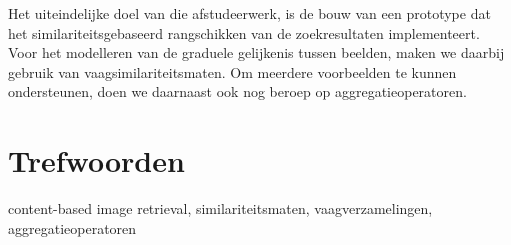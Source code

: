 Het uiteindelijke doel van die afstudeerwerk, is de bouw van een prototype dat
het similariteitsgebaseerd rangschikken van de zoekresultaten implementeert.
Voor het modelleren van de graduele gelijkenis tussen beelden, maken we daarbij gebruik van 
vaagsimilariteitsmaten. Om meerdere voorbeelden te kunnen ondersteunen, doen we 
daarnaast ook nog beroep op aggregatieoperatoren.

\section*{Trefwoorden}
content-based image retrieval, similariteitsmaten, vaagverzamelingen, aggregatieoperatoren

